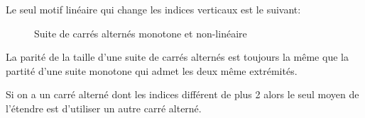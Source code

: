 \begin{proposition}
  \label{linear-pattern}
  Le seul motif linéaire qui change les indices verticaux est le suivant:

  \begin{figure}[H]
    \begin{center}
      \caption{Suite de carrés alternés monotone et non-linéaire}
    \end{center}
  \end{figure}

\end{proposition}


\begin{lemma}
  La parité de la taille d'une suite de carrés alternés est toujours la même que la partité d'une suite monotone qui admet les deux même extrémités.
\end{lemma}

\begin{lemma}
  \label{lemma-continue-alternating-square}
  Si on a un carré alterné dont les indices différent de plus 2 alors le seul moyen de l'étendre est d'utiliser un autre carré alterné.
\end{lemma}

